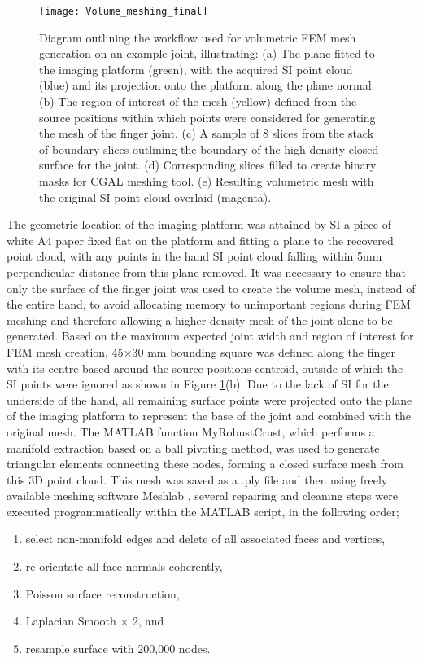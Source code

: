 \documentclass[twoside]{bhamthesis}
\theoremstyle{definition}
\begin{document}
\begin{figure}[!ht]
\texttt{[image: Volume\_meshing\_final]}
\centering
\caption{Diagram outlining the workflow used for volumetric FEM mesh generation on an example joint, illustrating: (a) The plane fitted to the imaging platform (green), with the acquired SI point cloud (blue) and its projection onto the platform along the plane normal. (b) The region of interest of the mesh (yellow) defined from the source positions within which points were considered for generating the mesh of the finger joint. (c) A sample of 8 slices from the stack of boundary slices outlining the boundary of the high density closed surface for the joint. (d) Corresponding slices filled to create binary masks for CGAL meshing tool. (e) Resulting volumetric mesh with the original SI point cloud overlaid (magenta).}
\centering
\label{Volume_meshing}
\end{figure}

The geometric location of the imaging platform was attained by SI a piece of white A4 paper fixed flat on the platform and fitting a plane to the recovered point cloud, with any points in the hand SI point cloud falling within 5mm perpendicular distance from this plane removed. It was necessary to ensure that only the surface of the finger joint was used to create the volume mesh, instead of the entire hand, to avoid allocating memory to unimportant regions during FEM meshing and therefore allowing a higher density mesh of the joint alone to be generated. Based on the maximum expected joint width and region of interest for FEM mesh creation, 45$\times$30 mm bounding square was defined along the finger with its centre based around the source positions centroid, outside of which the SI points were ignored as shown in Figure 
\ref{Volume_meshing}(b). Due to the lack of SI for the underside of the hand, all remaining surface points were projected onto the plane of the imaging platform to represent the base of the joint and combined with the original mesh. The MATLAB function MyRobustCrust, which performs a manifold extraction based on a ball pivoting method, was used to generate triangular elements connecting these nodes, forming a closed surface mesh from this 3D point cloud. This mesh was saved as a .ply file and then using freely available meshing software Meshlab \cite{meshlab}, several repairing and cleaning steps were executed programmatically within the MATLAB script, in the following order;

\begin{enumerate}
\itemsep0em 
\item select non-manifold edges and delete of all associated faces and vertices,
\item re-orientate all face normals coherently,
\item Poisson surface reconstruction, 
\item Laplacian Smooth $\times$ 2, and 
\item resample surface with 200,000 nodes. 
\end{enumerate}
\end{document}
